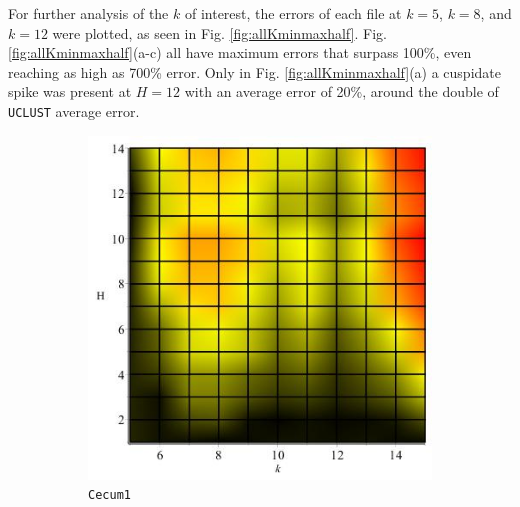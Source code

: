 \documentclass[../../main.tex]{subfiles}
\begin{document}
For further analysis of the $k$ of interest, the errors of each file at $k=5$, $k=8$, and $k=12$ were plotted, as seen in Fig. \ref{fig:allKminmaxhalf}. Fig. \ref{fig:allKminmaxhalf}(a-c) all have maximum errors that surpass 100\%, even reaching as high as 700\% error. Only in Fig. \ref{fig:allKminmaxhalf}(a) a cuspidate spike was present at $H=12$ with an average error of 20\%, around the double of \texttt{UCLUST} average error.\\


\begin{figure}[H]
\begin{subfigure}[b]{.5\textwidth}
\includegraphics[width=\textwidth]{precision/minmaxhalf/cecum1precise}
\caption{\texttt{Cecum1}}
\end{subfigure}
\begin{subfigure}[b]{.5\textwidth}

\end{subfigure}
\end{figure}
\end{document}
